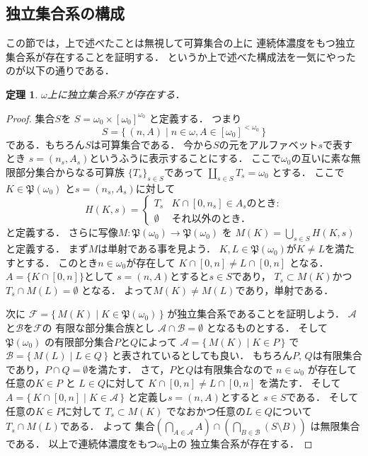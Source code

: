 \documentclass[leqno, a4paper, 12pt]{jsarticle}
\newtheorem{thm}{定理}
\newcommand{\myomega}{\omega_{0}}
\newcommand{\mypow}[1]{\mathfrak{P}(#1)}
\begin{document}
\subsection{独立集合系の構成}
この節では，上で述べたことは無視して可算集合の上に
連続体濃度をもつ独立集合系が存在することを証明する．
というか上で述べた構成法を一気にやったのが以下の通りである．
\begin{thm}
$\omega$上に独立集合系$\mathcal{F}$が存在する．
\end{thm}
\begin{proof}
集合$S$を
$S=\myomega\times [\myomega]^{\myomega}$
と定義する．
つまり
\[
S=\{\, (n, A)\mid n\in \omega, A\in [\myomega]^{<\myomega}\, \}
\]
である．もちろん$S$は可算集合である．
今から$S$の元をアルファベット$s$で表すとき
$s=(n_{s}, A_{s})$というふうに表示することにする．
ここで$\myomega$の互いに素な無限部分集合からなる可算族
$\{T_{s}\}_{s\in S}$であって
$\coprod_{s\in S}T_{s}=\myomega$
とする．
ここで$K\in \mypow{\myomega}$
と$s=(n_{s}, A_{s})$に対して
\[
H(K, s)=
\begin{cases}
T_{s} & \text{$K\cap [0, n_{s}]\in A_{s}$のとき:}\\
\emptyset & \textit{それ以外のとき．}
\end{cases}
\]
と定義する．
さらに写像$M\colon \mypow{\myomega}\to \mypow{\myomega}$
を
$M(K)=\bigcup_{s\in S}H(K, s)$
と定義する．
まず$M$は単射である事を見よう．
$K, L\in \mypow{\myomega}$が$K\neq L$を満たすとする．
このとき$n\in \myomega$が存在して
$K\cap [0, n]\neq L\cap [0, n]$
となる．$A=\{K\cap [0, n]\}$として
$s=(n, A)$とすると$s\in S$であり，
$T_{s}\subset M(K)$かつ
$T_{s}\cap M(L)=\emptyset$
となる．
よって$M(K)\neq M(L)$であり，単射である．

次に
$\mathcal{F}=\{\,M(K)\mid K\in \mypow{\myomega} \, \}$
が独立集合系であることを証明しよう．
$\mathcal{A}$と$\mathcal{B}$を$\mathcal{F}$の
有限な部分集合族とし
$\mathcal{A}\cap \mathcal{B}=\emptyset$
となるものとする．
そして$\mypow{\myomega}$
の有限部分集合$P$と$Q$によって
$\mathcal{A}=\{\, M(K)\mid K\in P\, \}$
で
$\mathcal{B}=\{\, M(L)\mid L\in Q\, \}$
と表されているとしても良い．
もちろん$P$, $Q$は有限集合であり，$P\cap Q=\emptyset$を満たす．
さて，$P$と$Q$は有限集合なので
$n\in \myomega$
が存在して任意の$K\in P$
と
$L\in Q$に対して
$K\cap [0, n]\neq L\cap [0, n]$
を満たす．
そして
$A=\{\, K\cap [0, n]\mid K\in \mathcal{A}\, \}$
と定義し$s=(n, A)$とすると
$s\in S$である．
そして
任意の$K\in P$に対して
$T_{s}\subset M(K)$
でなおかつ任意の$L\in Q$について
$T_{s}\cap M(L)$である．
よって
集合$\left(\bigcap_{A\in \mathcal{A}}A\right)\cap 
\left(\bigcap_{B\in \mathcal{B}}(S\setminus B)\right)$
は無限集合である．
以上で連続体濃度をもつ$\myomega$上の
独立集合系が存在する．
\end{proof}
\end{document}
